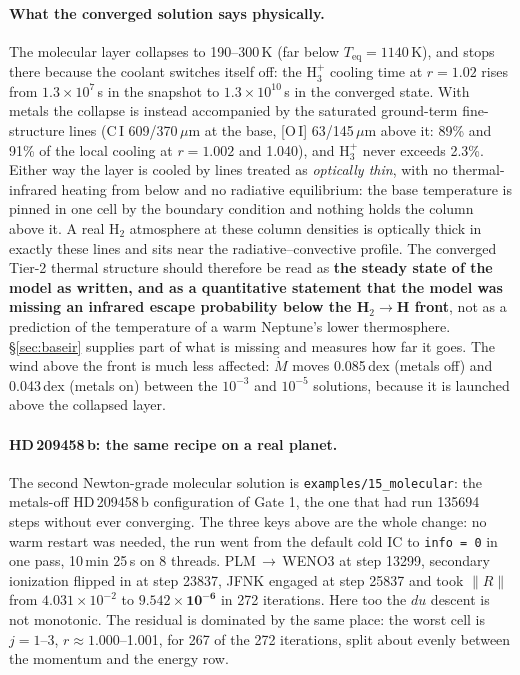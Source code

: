 \documentclass[english,a4paper]{my_memo}
\newcommand{\Mdot}{\dot{M}}
\begin{document}
\paragraph{What the converged solution says physically.} The molecular layer
collapses to 190--300\,K (far below $T_\mathrm{eq}=1140$\,K), and stops there
because the coolant switches itself off: the H$_3^+$ cooling time at $r=1.02$
rises from $1.3\times10^{7}$\,s in the snapshot to $1.3\times10^{10}$\,s in the
converged state. With metals the collapse is instead accompanied by the saturated
ground-term fine-structure lines (C\,I 609/370\,$\mu$m at the base, [O\,I]
63/145\,$\mu$m above it: 89\% and 91\% of the local cooling at $r=1.002$ and
1.040), and H$_3^+$ never exceeds 2.3\%. Either way the layer is cooled by lines
treated as \emph{optically thin}, with no thermal-infrared heating from below and
no radiative equilibrium: the base temperature is pinned in one cell by the
boundary condition and nothing holds the column above it. A real H$_2$ atmosphere
at these column densities is optically thick in exactly these lines and sits near
the radiative--convective profile. The converged Tier-2 thermal structure should
therefore be read as \textbf{the steady state of the model as written, and as a
quantitative statement that the model was missing an infrared escape probability
below the H$_2\to$H front}, not as a prediction of the temperature of a warm
Neptune's lower thermosphere. \S\ref{sec:baseir} supplies part of what is missing
and measures how far it goes. The wind above the front is much less affected:
$\Mdot$ moves 0.085\,dex (metals off) and 0.043\,dex (metals on) between the
$10^{-3}$ and $10^{-5}$ solutions, because it is launched above the collapsed
layer.

\paragraph{HD\,209458\,b: the same recipe on a real planet.} The second
Newton-grade molecular solution is \texttt{examples/}\allowbreak\texttt{15\_molecular}: the
metals-off HD\,209458\,b configuration of Gate 1, the one that had run 135694
steps without ever converging. The three keys above are the whole change: no warm
restart was needed, the run went from the default cold IC to \texttt{info = 0} in
one pass, 10\,min 25\,s on 8 threads. PLM\,$\to$\,WENO3 at step 13299, secondary
ionization flipped in at step 23837, JFNK engaged at step 25837 and took $\|R\|$
from $4.031\times10^{-2}$ to $\mathbf{9.542\times10^{-6}}$ in 272 iterations. Here
too the $du$ descent is not monotonic. The residual is dominated by the same
place: the worst cell is $j=1$--3, $r\approx1.000$--1.001, for 267 of the 272
iterations, split about evenly between the momentum and the energy row.
\end{document}
